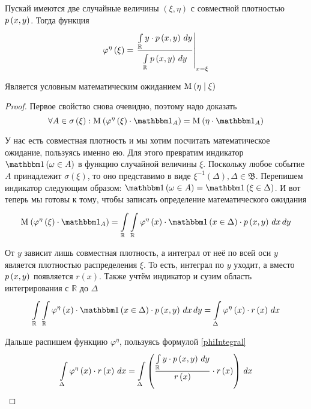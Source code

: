 \begin{lemma}
    Пускай имеются две случайные величины $\left( \xi, \eta \right)$
    с совместной плотностью $\pdf{x,y}$.
    Тогда функция
    $$\varphi^{\eta}\left( \xi \right)
        = \left. \frac{\integral{\mathbb{R}}{}{y}{y \cdot \pdf{x,y}}}
            {\integral{\mathbb{R}}{}{y}{\pdf{x,y}}} \right|_{x=\xi}$$

    Является условным математическим ожиданием
    $\mean{\left( \eta \mid \xi \right)}$

\end{lemma}
\begin{proof}
Первое свойство снова очевидно, поэтому надо доказать
\begin{equation}\label{conditionalExpectationContinualStart}
    \forall A \in \sigma\left( \xi \right):
        \mean{\left( \varphi^{\eta}\left( \xi \right)
            \cdot \indicatorof{A} \right)}
            = \mean{\left( \eta \cdot \indicatorof{A} \right)}
\end{equation}

У нас есть совместная плотность и мы хотим посчитать математическое ожидание,
пользуясь именно ею.
Для этого превратим индикатор $\indicator{\omega \in A}$
в функцию случайной величины $\xi$.
Поскольку любое событие $A$ принадлежит $\sigma\left( \xi \right)$,
то оно представимо в виде
$\xi^{-1}\left( \Delta \right), \Delta \in \mathfrak{B}$.
Перепишем индикатор следующим образом:
$\indicator{\omega \in A} = \indicator{\xi \in \Delta}$.
И вот теперь мы готовы к тому,
чтобы записать определение математического ожидания
$$\mean{\left( \varphi^{\eta}\left( \xi \right) \cdot \indicatorof{A} \right)}
    = \integral{\mathbb{R}}{}{y}{ \integral{\mathbb{R}}{}{x}{
        \varphi^{\eta}\left( x \right) \cdot \indicator{x \in \Delta}
            \cdot \pdf{x,y}}}$$

От $y$ зависит лишь совместная плотность, а интеграл от неё по всей оси $y$
является плотностью распределения $\xi$.
То есть, интеграл по $y$ уходит,
а вместо $\pdf{x,y}$ появляется $r\left( x \right)$.
Также учтём индикатор и сузим область интегрирования с $\mathbb{R}$ до $\Delta$
$$\integral{\mathbb{R}}{}{y}{ \integral{\mathbb{R}}{}{x}{
    \varphi^{\eta}\left( x \right) \cdot \indicator{x \in \Delta}
        \cdot \pdf{x,y}}}
    = \integral{\Delta}{}{x}{
        \varphi^{\eta}\left( x \right) \cdot r\left( x \right)}$$

Дальше распишем функцию $\varphi^{\eta}$,
пользуясь формулой \eqref{phiIntegral}
$$\integral{\Delta}{}{x}{
    \varphi^{\eta}\left( x \right) \cdot r\left( x \right)}
    = \integral{\Delta}{}{x}{\left(
        \frac{\integral{\mathbb{R}}{}{y}{y \cdot \pdf{x,y}}}
            {r\left( x \right)}
        \cdot r\left( x \right) \right)}$$


\end{proof}
